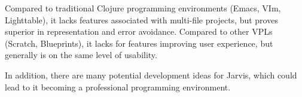 \documentclass[english,mgr,shortabstract]{iithesis}
\begin{document}
Compared to traditional Clojure programming environments (Emacs, VIm,
Lighttable), it lacks features associated with
multi-file projects, but proves superior in representation and error avoidance.
Compared to other VPLs (Scratch, Blueprints), it lacks for features improving
user experience, but generally is on the same level of usability.

In addition, there are many potential development ideas for Jarvis, which could lead
to it becoming a professional programming environment.



\end{document}
